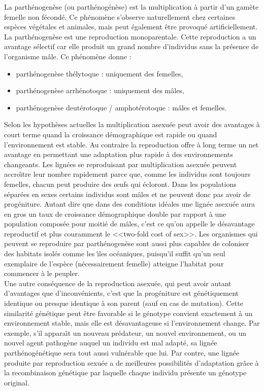 \documentclass[11pt,twoside,a4paper]{article}
\begin{document}
La parth{\'e}nogen{\`e}se (ou parth{\'e}nog{\'e}n{\`e}se) est la multiplication {\`a} partir d'un gam{\`e}te femelle non f{\'e}cond{\'e}. Ce ph{\'e}nom{\`e}ne s'observe naturellement chez certaines esp{\`e}ces v{\'e}g{\'e}tales et animales, mais peut {\'e}galement {\^e}tre provoqu{\'e} artificiellement. La parth{\'e}nogen{\`e}se est une reproduction monoparentale. Cette reproduction a un avantage s{\'e}lectif car elle produit un grand nombre d'individus sans la pr{\'e}sence de l'organisme m{\^a}le. Ce ph{\'e}nom{\`e}ne donne :
\begin{itemize}
	\item parth{\'e}nogen{\`e}se th{\'e}lytoque : uniquement des femelles,
	\item parth{\'e}nogen{\`e}se arrh{\'e}notoque : uniquement des m{\^a}les,
	\item parth{\'e}nogen{\`e}se deut{\'e}rotoque / amphot{\'e}rotoque : m{\^a}les et femelles.
\end{itemize}
\clearpage

Selon les hypoth{\`e}ses actuelles la multiplication asexu{\'e}e peut avoir des avantages {\`a} court terme quand la croissance d{\'e}mographique est rapide ou quand l'environnement est stable. Au contraire la reproduction offre {\`a} long terme un net avantage en permettant une adaptation plus rapide {\`a} des environnements changeants. Les lign{\'e}es se reproduisant par multiplication asexu{\'e}e peuvent accro{\^\i}tre leur nombre rapidement parce que, comme les individus sont toujours femelles, chacun peut produire des \oe ufs qui {\'e}cloront. Dans les populations s{\'e}par{\'e}es en sexes certains individus sont m{\^a}les et ne peuvent donc pas avoir de prog{\'e}niture. Autant dire que dans des conditions id{\'e}ales une lign{\'e}e asexu{\'e}e aura en gros un taux de croissance d{\'e}mographique double par rapport {\`a} une population compos{\'e}e pour moiti{\'e} de m{\^a}les, c'est ce qu'on appelle le d{\'e}savantage reproductif et plus couramment le <<two-fold cost of sex>>. Les organismes qui peuvent se reproduire par parth{\'e}nogen{\`e}se sont aussi plus capables de coloniser des habitats isol{\'e}s comme les {\^\i}les oc{\'e}aniques, puisqu'il suffit qu'un seul exemplaire de l'esp{\`e}ce (n{\'e}cessairement femelle) atteigne l'habitat pour commencer {\`a} le peupler.~\\

Une autre cons{\'e}quence de la reproduction asexu{\'e}e, qui peut avoir autant d'avantages que d'inconv{\'e}nients, c'est que la prog{\'e}niture est g{\'e}n{\'e}tiquement identique ou presque identique {\`a} son parent (sauf en cas de mutation). Cette similarit{\'e} g{\'e}n{\'e}tique peut {\^e}tre favorable si le g{\'e}notype convient exactement {\`a} un environnement stable, mais elle est d{\'e}savantageuse si l'environnement change. Par exemple, s'il appara{\^\i}t un nouveau pr{\'e}dateur, un nouvel environnement, ou un nouvel agent pathog{\`e}ne auquel un individu est mal adapt{\'e}, sa lign{\'e}e parth{\'e}nog{\'e}n{\'e}tique sera tout aussi vuln{\'e}rable que lui. Par contre, une lign{\'e}e produite par reproduction sexu{\'e}e a de meilleures possibilit{\'e}s d'adaptation gr{\^a}ce {\`a} la recombinaison g{\'e}n{\'e}tique par laquelle chaque individu pr{\'e}sente un g{\'e}notype original.
\end{document}
